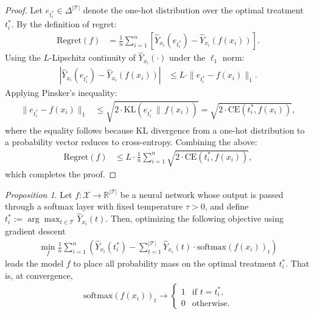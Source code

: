 \documentclass{article}
\theoremstyle{remark}
\newtheorem{proposition}{Proposition}
\begin{document}
\begin{proof}
Let $e_{t_i^*} \in \Delta^{|\mathcal{T}|}$ denote the one-hot distribution over the optimal treatment $t_i^*$. By the definition of regret:
\begin{align}
\text{Regret}(f) &= \frac{1}{n} \sum_{i=1}^n \left[ \hat{Y}_{x_i}(e_{t_i^*}) - \hat{Y}_{x_i}(f(x_i)) \right].
\end{align}
\noindent Using the $L$-Lipschitz continuity of $\hat{Y}_{x_i}(\cdot)$ under the $\ell_1$ norm:
\begin{align}
\left| \hat{Y}_{x_i}(e_{t_i^*}) - \hat{Y}_{x_i}(f(x_i)) \right| &\leq L \cdot \|e_{t_i^*} - f(x_i)\|_1.
\end{align}
\noindent Applying Pinsker’s inequality:
\begin{align}
\|e_{t_i^*} - f(x_i)\|_1 &\leq \sqrt{2 \cdot \text{KL}(e_{t_i^*} \,\|\, f(x_i))} = \sqrt{2 \cdot \text{CE}(t_i^*, f(x_i))},
\end{align}
where the equality follows because KL divergence from a one-hot distribution to a probability vector reduces to cross-entropy. Combining the above:
\begin{align}
\text{Regret}(f) &\leq L \cdot \frac{1}{n} \sum_{i=1}^n \sqrt{2 \cdot \text{CE}(t_i^*, f(x_i))},
\end{align}
which completes the proof.
\end{proof}



\begin{proposition}
Let $f: \mathcal{X} \to \mathbb{R}^{|\mathcal{T}|}$ be a neural network whose output is passed through a softmax layer with fixed temperature $\tau > 0$, and define $t^*_i := \arg\max_{t \in \mathcal{T}} \hat{Y}_{x_i}(t)$. Then, optimizing  the following objective using gradient descent 
\begin{align}
    \min_f \frac{1}{n} \sum_{i=1}^n \left( \hat{Y}_{x_i}(t^*_i) - \sum_{t=1}^{|\mathcal{T}|} \hat{Y}_{x_i}(t) \cdot \mathrm{softmax}(f(x_i))_t \right)
\end{align}
leads the model $f$ to place all probability mass on the optimal treatment $t^*_i$. That is, at convergence,
\begin{align}
    \mathrm{softmax}(f(x_i))_t \to 
    \begin{cases}
        1 & \text{if } t = t^*_i, \\
        0 & \text{otherwise}.
    \end{cases}
\end{align}
\end{proposition}
\end{document}
